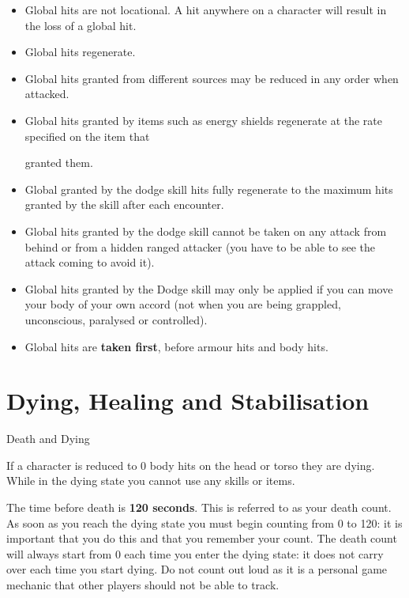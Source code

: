 \begin{itemize}
\item Global hits are not locational. A hit anywhere on a character will result in the loss of a global hit.

\item Global hits regenerate.

\item Global hits granted from different sources may be reduced in any order when attacked.

\item Global hits granted by items such as energy shields regenerate at the rate specified on the item that

granted them.

\item Global granted by the dodge skill hits fully regenerate to the maximum hits granted by the skill after each encounter.

\item Global hits granted by the dodge skill cannot be taken on any attack from behind or from a hidden ranged attacker (you have to be able to see the attack coming to avoid it).

\item Global hits granted by the Dodge skill may only be applied if you can move your body of your own accord (not when you are being grappled, unconscious, paralysed or controlled).

\item Global hits are \textbf{taken first}, before armour hits and body hits.

\end{itemize}
\chapter{Dying, Healing and Stabilisation}

Death and Dying

If a character is reduced to 0 body hits on the head or torso they are dying. While in the dying state you cannot use any skills or items.

The time before death is \textbf{120 seconds}. This is referred to as your death count. As soon as you reach the dying state you must begin counting from 0 to 120: it is important that you do this and that you remember your count. The death count will always start from 0 each time you enter the dying state: it does not carry over each time you start dying. Do not count out loud as it is a personal game mechanic that other players should not be able to track.

